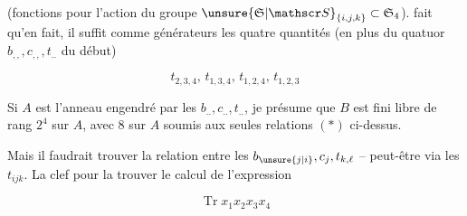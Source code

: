 
(fonctions   pour l'action du groupe $\unsure{\mathfrak S|\mathscr S}_{\{i,j,k\}}\subset\mathfrak S_4$).  fait qu'en fait, il suffit comme générateurs les quatre quantités (en plus du quatuor $b_{,,},c_{,,},t_{..}$ du début)

\[
 t_{2,3,4},\,t_{1,3,4},\,t_{1,2,4},\,t_{1,2,3}
\]

Si $A$ est l'anneau engendré par les $b_{..},c_{..},t_{..}$, je présume que $B$ est fini libre de rang $2^4$ sur $A$, avec $8$   sur $A$ soumis aux seules relations $(\ast)$ ci-dessus.

Mais il faudrait trouver la relation entre les $b_{\unsure{j|i}},c_j,t_{k,\ell}$ -- peut-être via les $t_{ijk}$. La clef pour la trouver   le calcul de l'expression

\[
 \operatorname{Tr} x_1x_2x_3x_4
\]

\deleted{\unsure{,}}
